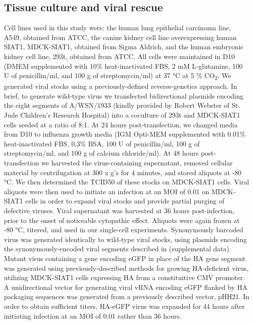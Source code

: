 \documentclass[9pt,lineno]{elife}
\begin{document}
\subsection{Tissue culture and viral rescue}
Cell lines used in this study were: the human lung epithelial carcinoma line, A549, obtained from ATCC, the canine kidney cell line overexpressing human SIAT1, MDCK-SIAT1, obtained from Sigma Aldrich, and the human embryonic kidney cell line, 293t, obtained from ATCC. 
All cells were maintained in D10 (DMEM supplemented with 10\% heat-inactivated FBS, 2 mM L-glutamine, 100 U of penicillin/ml, and 100 \si{\micro}g of streptomycin/ml) at 37 \si{\degreeCelsius} at 5 \% CO\textsubscript{2}.
We generated viral stocks using a previously-defined reverse-genetics approach. 
In brief, to generate wild-type virus we transfected bidirectional plasmids encoding the eight segments of A/WSN/1933 (kindly provided by Robert Webster of St. Jude Children's Research Hospital) into a coculture of 293t and MDCK-SIAT1 cells seeded at a ratio of 8:1. 
At 24 hours post-transfection, we changed media from D10 to influenza growth media (IGM Opti-MEM supplemented with 0.01\% heat-inactivated FBS, 0.3\% BSA, 100 U of penicillin/ml, 100  \si{\micro}g of streptomycin/ml, and 100 \si{\micro}g of calcium chloride/ml).
At 48 hours post-transfection we harvested the virus-containing supernatant, removed cellular material by centrifugation at 300 x g's for 4 minutes, and stored aliquots at -80 \si{\degreeCelsius }. 
We then determined the TCID50 of these stocks on MDCK-SIAT1 cells.
Viral aliquots were then used to initiate an infection at an MOI of 0.01 on MDCK-SIAT1 cells in order to expand viral stocks and provide partial purging of defective viruses.
Viral supernatant was harvested at 36 hours post-infection, prior to the onset of noticeable cytopathic effect. 
Aliquots were again frozen at -80  \si{\degreeCelsius }, titered, and used in our single-cell experiments.
Synonymously barcoded virus was generated identically to wild-type viral stocks, using plasmids encoding the synonymously-encoded viral segments described in (supplemental data).
Mutant virus containing a gene encoding eGFP in place of the HA gene segment was generated using previously-described methods for growing HA-deficient virus, utilizing MDCK-SIAT1 cells expressing HA from a constituitive CMV promoter.
A unidirectional vector for generating viral vRNA encoding eGFP flanked by HA packaging sequences was generated from a previously described vector, pHH21. 
In order to obtain sufficient titers, HA-eGFP virus was expanded for 44 hours after initiating infection at an MOI of 0.01 rather than 36 hours.
\end{document}

